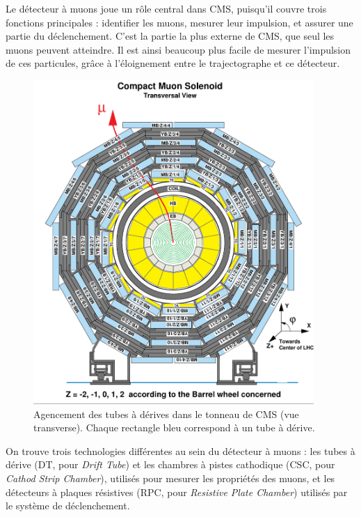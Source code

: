 Le détecteur à muons joue un rôle central dans CMS, puisqu'il couvre trois fonctions principales : identifier les muons, mesurer leur impulsion, et assurer une partie du déclenchement. C'est la partie la plus externe de CMS, que seul les muons peuvent atteindre. Il est ainsi beaucoup plus facile de mesurer l'impulsion de ces particules, grâce à l'éloignement entre le trajectographe et ce détecteur.

\begin{figure}[p] \centering
  \includegraphics[width=0.95\textwidth]{chapitre2/figs/CMS_transverse_view.pdf}
  \caption{Agencement des tubes à dérives dans le tonneau de CMS (vue transverse). Chaque rectangle bleu correspond à un tube à dérive.}
  \label{fig:cms_dt}
\end{figure}

On trouve trois technologies différentes au sein du détecteur à muons : les tubes à dérive (DT, pour \emph{Drift Tube}) et les chambres à pistes cathodique (CSC, pour \emph{Cathod Strip Chamber}), utilisés pour mesurer les propriétés des muons, et les détecteurs à plaques résistives (RPC, pour \emph{Resistive Plate Chamber}) utilisés par le système de déclenchement.

